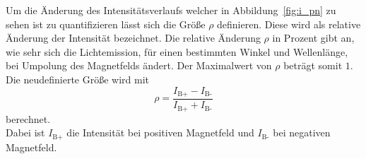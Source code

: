 Um die Änderung des Intensitätsverlaufs welcher in Abbildung~\ref{fig:i_pn} zu sehen ist zu quantifizieren
lässt sich die Größe $\rho$ definieren. 
Diese wird als relative Änderung der Intensität bezeichnet.
Die relative Änderung $\rho$ in Prozent gibt an, 
wie sehr sich die Lichtemission, für einen bestimmten Winkel und Wellenlänge, bei Umpolung des Magnetfelds ändert. 
Der Maximalwert von $\rho$ beträgt somit $1$.
Die neudefinierte Größe wird mit 
\begin{equation}
    \rho = \frac{I_\text{B+} - I_\text{B-} }{ I_\text{B+} + I_\text{B-} }
\end{equation}
berechnet.\\
Dabei ist $I_\text{B+}$ die Intensität bei positiven Magnetfeld und $I_\text{B-}$ bei negativen Magnetfeld.

